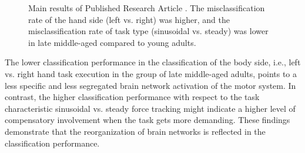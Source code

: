\begin{figure}[h]

\captionsetup{justification=justified}
\caption[Main results of Published Research Article .]{Main results of Published Research Article . The misclassification rate of the hand side (left vs. right)  was higher, and the misclassification rate of task type (sinusoidal vs. steady) was lower in late middle-aged compared to young adults.}
\label{fig:results1}
\end{figure}

\noindent The lower classification performance in the classification of the body side, i.e., left vs. right hand task execution in the group of late middle-aged adults, points to a less specific and less segregated brain network activation of the motor system. In contrast, the higher classification performance with respect to the task characteristic sinusoidal vs. steady force tracking might indicate a higher level of compensatory involvement when the task gets more demanding. These findings demonstrate that the reorganization of brain networks is reflected in the classification performance.

